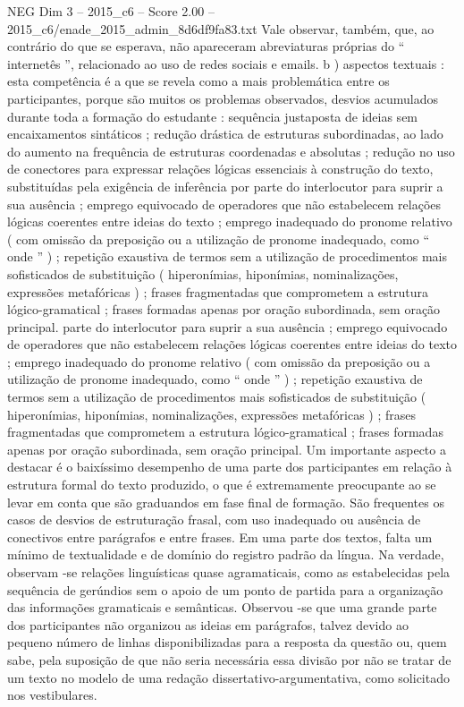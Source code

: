 \begin{textsample}{NEG Dim 3 – 2015\_c6 – Score 2.00 – 2015\_c6/enade\_2015\_admin\_8d6df9fa83.txt}
Vale observar, também, que, ao contrário do que se esperava, não apareceram abreviaturas próprias do “ internetês ”, relacionado ao uso de redes sociais e emails. b ) aspectos textuais : esta competência é a que se revela como a mais problemática entre os participantes, porque são muitos os problemas observados, desvios acumulados durante toda a formação do estudante : sequência justaposta de ideias sem encaixamentos sintáticos ; redução drástica de estruturas subordinadas, ao lado do aumento na frequência de estruturas coordenadas e absolutas ; redução no uso de conectores para expressar relações lógicas essenciais à construção do texto, substituídas pela exigência de inferência por parte do interlocutor para suprir a sua ausência ; emprego equivocado de operadores que não estabelecem relações lógicas coerentes entre ideias do texto ; emprego inadequado do pronome relativo ( com omissão da preposição ou a utilização de pronome inadequado, como “ onde ” ) ; repetição exaustiva de termos sem a utilização de procedimentos mais sofisticados de substituição ( hiperonímias, hiponímias, nominalizações, expressões metafóricas ) ; frases fragmentadas que comprometem a estrutura lógico-gramatical ; frases formadas apenas por oração subordinada, sem oração principal. parte do interlocutor para suprir a sua ausência ; emprego equivocado de operadores que não estabelecem relações lógicas coerentes entre ideias do texto ; emprego inadequado do pronome relativo ( com omissão da preposição ou a utilização de pronome inadequado, como “ onde ” ) ; repetição exaustiva de termos sem a utilização de procedimentos mais sofisticados de substituição ( hiperonímias, hiponímias, nominalizações, expressões metafóricas ) ; frases fragmentadas que comprometem a estrutura lógico-gramatical ; frases formadas apenas por oração subordinada, sem oração principal.
Um importante aspecto a destacar é o baixíssimo desempenho de uma parte dos participantes em relação à estrutura formal do texto produzido, o que é extremamente preocupante ao se levar em conta que são graduandos em fase final de formação.
São frequentes os casos de desvios de estruturação frasal, com uso inadequado ou ausência de conectivos entre parágrafos e entre frases.
Em uma parte dos textos, falta um mínimo de textualidade e de domínio do registro padrão da língua.
Na verdade, observam -se relações linguísticas quase agramaticais, como as estabelecidas pela sequência de gerúndios sem o apoio de um ponto de partida para a organização das informações gramaticais e semânticas.
Observou -se que uma grande parte dos participantes não organizou as ideias em parágrafos, talvez devido ao pequeno número de linhas disponibilizadas para a resposta da questão ou, quem sabe, pela suposição de que não seria necessária essa divisão por não se tratar de um texto no modelo de uma redação dissertativo-argumentativa, como solicitado nos vestibulares.

\end{textsample}
